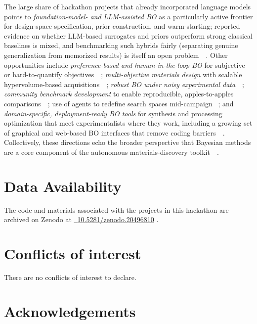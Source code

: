 \documentclass[superscriptaddress, nofootinbib,  amsmath, amssymb, twocolumn]{revtex4-2} %
\newcommand{\zenodolink}[1]{%
  \href{https://doi.org/#1}{\faArchive\ \url{#1}}%
}
\let\originalcite\cite
\renewcommand{\cite}[1]{\unskip~\originalcite{#1}}
\begin{document}
The large share of hackathon projects that already incorporated language models points to \emph{foundation-model- and LLM-assisted BO} as a particularly active frontier for design-space specification, prior construction, and warm-starting; reported evidence on whether LLM-based surrogates and priors outperform strong classical baselines is mixed, and benchmarking such hybrids fairly (separating genuine generalization from memorized results) is itself an open problem~\cite{kristiadi_sober_2024, rankovic_gollum_2025}. Other opportunities include \emph{preference-based and human-in-the-loop BO} for subjective or hard-to-quantify objectives~\cite{adachi_looping_2024, deneault_preferential_2025}; \emph{multi-objective materials design} with scalable hypervolume-based acquisitions~\cite{ament_sustainable_2023}; \emph{robust BO under noisy experimental data}~\cite{aldeghi_golem_2021, altamirano_robust_2023}; \emph{community benchmark development} to enable reproducible, apples-to-apples comparisons~\cite{liang_benchmarking_2021, felton_summit_2021}; use of agents to redefine search spaces mid-campaign \cite{muller_la_agente_optima_2026}; and \emph{domain-specific, deployment-ready BO tools} for synthesis and processing optimization that meet experimentalists where they work, including a growing set of graphical and web-based BO interfaces that remove coding barriers~\cite{durholt_bofire_2024, fitzner_baybe_2022, ishii_boxvia_2022, torres_multi-objective_2022, tamura_nims-os_2023}. Collectively, these directions echo the broader perspective that Bayesian methods are a core component of the autonomous materials-discovery toolkit~\cite{arroyave_perspective_2022}.


\section*{Data Availability}

The code and materials associated with the projects in this hackathon are archived on Zenodo at \zenodolink{10.5281/zenodo.20496810}.

\section*{Conflicts of interest}

There are no conflicts of interest to declare.

\section*{Acknowledgements}
\end{document}
